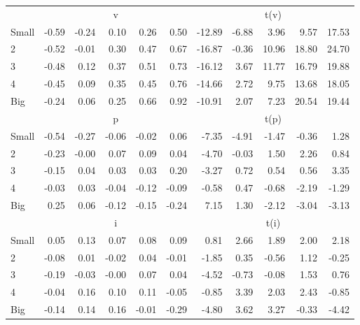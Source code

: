 \begin{table}[!ht]
\begin{tabular}{lrrrrrrrrrr}
  
     & \multicolumn{5}{c}{v} & \multicolumn{5}{c}{t(v)}   \\
     \cmidrule(r){2-6} \cmidrule(r){7-11} 
    Small  & -0.59  & -0.24  & 0.10  & 0.26  & 0.50  & -12.89  & -6.88  & 3.96  & 9.57  & 17.53   \\
    2  & -0.52  & -0.01  & 0.30  & 0.47  & 0.67  & -16.87  & -0.36  & 10.96  & 18.80  & 24.70   \\
    3  & -0.48  & 0.12  & 0.37  & 0.51  & 0.73  & -16.12  & 3.67  & 11.77  & 16.79  & 19.88   \\
    4  & -0.45  & 0.09  & 0.35  & 0.45  & 0.76  & -14.66  & 2.72  & 9.75  & 13.68  & 18.05   \\
    Big  & -0.24  & 0.06  & 0.25  & 0.66  & 0.92  & -10.91  & 2.07  & 7.23  & 20.54  & 19.44   \\
    
  
     & \multicolumn{5}{c}{p} & \multicolumn{5}{c}{t(p)}   \\
     \cmidrule(r){2-6} \cmidrule(r){7-11} 
    Small  & -0.54  & -0.27  & -0.06  & -0.02  & 0.06  & -7.35  & -4.91  & -1.47  & -0.36  & 1.28   \\
    2  & -0.23  & -0.00  & 0.07  & 0.09  & 0.04  & -4.70  & -0.03  & 1.50  & 2.26  & 0.84   \\
    3  & -0.15  & 0.04  & 0.03  & 0.03  & 0.20  & -3.27  & 0.72  & 0.54  & 0.56  & 3.35   \\
    4  & -0.03  & 0.03  & -0.04  & -0.12  & -0.09  & -0.58  & 0.47  & -0.68  & -2.19  & -1.29   \\
    Big  & 0.25  & 0.06  & -0.12  & -0.15  & -0.24  & 7.15  & 1.30  & -2.12  & -3.04  & -3.13   \\


     & \multicolumn{5}{c}{i} & \multicolumn{5}{c}{t(i)}   \\
     \cmidrule(r){2-6} \cmidrule(r){7-11} 
    Small  & 0.05  & 0.13  & 0.07  & 0.08  & 0.09  & 0.81  & 2.66  & 1.89  & 2.00  & 2.18   \\
    2  & -0.08  & 0.01  & -0.02  & 0.04  & -0.01  & -1.85  & 0.35  & -0.56  & 1.12  & -0.25   \\
    3  & -0.19  & -0.03  & -0.00  & 0.07  & 0.04  & -4.52  & -0.73  & -0.08  & 1.53  & 0.76   \\
    4  & -0.04  & 0.16  & 0.10  & 0.11  & -0.05  & -0.85  & 3.39  & 2.03  & 2.43  & -0.85   \\
    Big  & -0.14  & 0.14  & 0.16  & -0.01  & -0.29  & -4.80  & 3.62  & 3.27  & -0.33  & -4.42   \\
    
  
  \bottomrule
\end{tabular}
\label{tbl:25_Size_BM_F16}
\end{table}